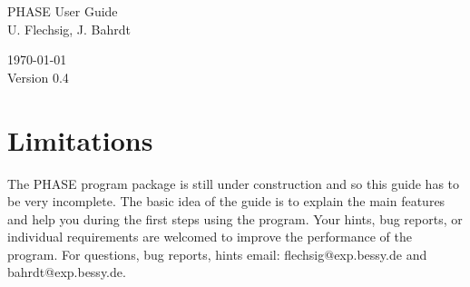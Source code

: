 \documentclass [12pt]{report}
\begin{document}
\initfloatingfigs
  \thispagestyle{empty}
  

  \HRule
  \begin {flushright}
  {\Huge PHASE  User Guide}\\[5mm] 
  {\Large U. Flechsig, J. Bahrdt}
  \end{flushright}
  \HRule
  \begin{center}
    \today \\[1cm]
    Version 0.4

  \end{center}

\pagebreak

\section* {Limitations}
The PHASE program package is still under construction and so this guide has to
be very incomplete. The basic idea of the guide is to explain the main features
and help you during the first steps using the program. Your hints, bug reports,
or individual requirements are welcomed to improve the performance of the 
program. For questions, bug reports, hints email: flechsig@exp.bessy.de and
bahrdt@exp.bessy.de.

  \tableofcontents
  \listoffigures
  
  
  
  
  
  
       
\end{document}
